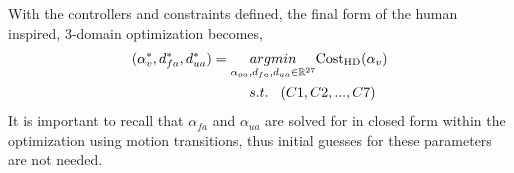  With the controllers and constraints defined, the final form of the human inspired, 3-domain optimization becomes,
\begin{align}
\label{eq:OptimizationFinal}
 (\alpha^{*}_{v},d^{*}_{fa},d ^{*}_{ua}) =  \underset{\alpha_{oa},d_{fa},d_{ua}\in \mathbb{R}^{27}}{argmin}  \mathrm{Cost_{HD}}(\alpha_{v}) \\ \vspace{1mm}
 s.t. \hspace{3mm} (C1,C2,...,C7) \hspace{3mm} \nonumber
\end{align}
It is important to recall that $\alpha_{fa}$ and $\alpha_{ua}$ are solved for in closed form within the optimization 
using motion transitions, thus initial guesses for these parameters are not needed.

